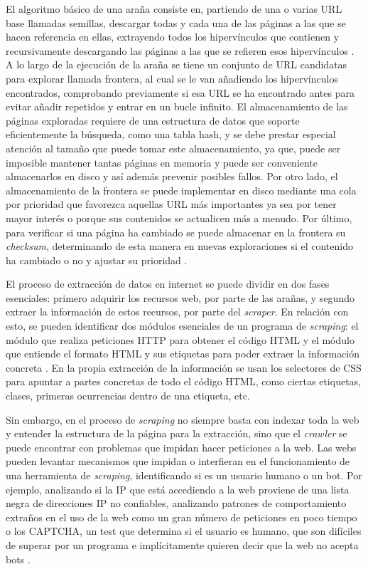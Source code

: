 El algoritmo básico de una araña consiste en, partiendo de una o varias URL base
llamadas semillas, descargar todas y cada una de las páginas a las que se hacen
referencia en ellas, extrayendo todos los hipervínculos que contienen y
recursivamente descargando las páginas a las que se refieren esos hipervínculos
\cite{olston2010web}. A lo largo de la ejecución de la araña se tiene un
conjunto de URL candidatas para explorar llamada frontera, al cual se le van
añadiendo los hipervínculos encontrados, comprobando previamente si esa URL se
ha encontrado antes para evitar añadir repetidos y entrar en un bucle infinito.
El almacenamiento de las páginas exploradas requiere de una estructura de datos
que soporte eficientemente la búsqueda, como una tabla hash, y se debe prestar
especial atención al tamaño que puede tomar este almacenamiento, ya que, puede
ser imposible mantener tantas páginas en memoria y puede ser conveniente
almacenarlos en disco y así además prevenir posibles fallos. Por otro lado, el
almacenamiento de la frontera se puede implementar en disco mediante una cola
por prioridad que favorezca aquellas URL más importantes ya sea por tener mayor
interés o porque sus contenidos se actualicen más a menudo. Por último, para
verificar si una página ha cambiado se puede almacenar en la frontera su
\textit{checksum}, determinando de esta manera en nuevas exploraciones si el
contenido ha cambiado o no y ajustar su prioridad \cite{najork2009web}.

El proceso de extracción de datos en internet se puede dividir en dos fases
esenciales: primero adquirir los recursos web, por parte de las arañas, y
segundo extraer la información de estos recursos, por parte del
\textit{scraper}. En relación con esto, se pueden identificar dos módulos
esenciales de un programa de \textit{scraping}: el módulo que realiza peticiones
HTTP para obtener el código HTML y el módulo que entiende el formato HTML y sus
etiquetas para poder extraer la información concreta \cite{zhao2017web}. En la
propia extracción de la información se usan los selectores de CSS para apuntar a
partes concretas de todo el código HTML, como ciertas etiquetas, clases,
primeras ocurrencias dentro de una etiqueta, etc. \cite{scraperworld}

Sin embargo, en el proceso de \textit{scraping} no siempre basta con indexar
toda la web y entender la estructura de la página para la extracción, sino que
el \textit{crawler} se puede encontrar con problemas que impidan hacer
peticiones a la web. Las webs pueden levantar mecanismos que impidan o
interfieran en el funcionamiento de una herramienta de \textit{scraping},
identificando si es un usuario humano o un bot. Por ejemplo, analizando si la IP
que está accediendo a la web proviene de una lista negra de direcciones IP no
confiables, analizando patrones de comportamiento extraños en el uso de la web
como un gran número de peticiones en poco tiempo \cite{zhao2017web} o los
CAPTCHA, un test que determina si el usuario es humano, que son difíciles de
superar por un programa e implícitamente quieren decir que la web no acepta bots
\cite{apress2018scraping}. 

